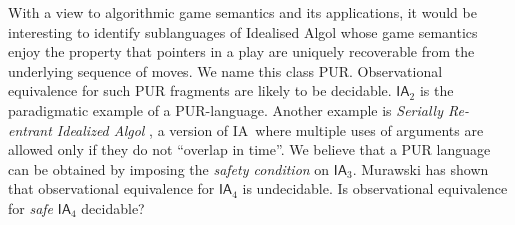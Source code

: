 \documentclass{llncs}
\newcommand\ialgol{\textsf{IA}}
\begin{document}
With a view to algorithmic game semantics and its applications, it
would be interesting to identify sublanguages of Idealised Algol whose
game semantics enjoy the property that pointers in a play are uniquely
recoverable from the underlying sequence of moves. We name this class
PUR. Observational equivalence for such PUR fragments are likely to be
decidable. $\ialgol_2$ is the paradigmatic example of a
PUR-language. Another example is \emph{Serially Re-entrant Idealized
  Algol} \cite{abramsky:mchecking_ia}, a version of \ialgol\ where
multiple uses of arguments are allowed only if they do not ``overlap
in time''.  We believe that a PUR language can be obtained by imposing
the \emph{safety condition} on $\ialgol_3$. Murawski \cite{Mur03} has
shown that observational equivalence for $\ialgol_4$ is
undecidable. Is observational equivalence for \emph{safe} $\ialgol_4$
decidable?

% 
% 
\end{document}
